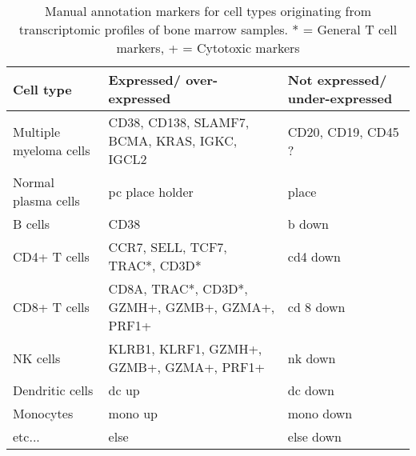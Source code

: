 \begin{table}[h]
    \centering
\begin{tabular}{|p{2cm}|p{6cm}|p{5cm}|}
\hline
\textbf{Cell type}     & \textbf{Expressed/ over-expressed}                                                                      & \textbf{Not expressed/ under-expressed} \\ \hline
Multiple myeloma cells & CD38, CD138, SLAMF7,  BCMA, KRAS, IGKC, IGCL2                                                             & CD20, CD19, CD45 ?                       \\ \hline
Normal plasma cells    & pc place holder                                                                                           & place                                    \\ \hline
B cells                & CD38                                                                                                      & b down                                   \\ \hline
CD4+ T cells           & CCR7, SELL, TCF7, TRAC*, CD3D*                                                                            & cd4 down                                 \\ \hline
CD8+ T cells           & CD8A, TRAC*,  CD3D*, GZMH+,  GZMB+,  GZMA+,  PRF1+                                                        & cd 8 down                                                         \\ \hline
NK cells               & KLRB1,  KLRF1, GZMH+,  GZMB+,  GZMA+,  PRF1+                                                              & nk down                                  \\ \hline
Dendritic cells        & dc up                                                                                                     & dc down                                  \\ \hline
Monocytes              & mono up                                                                                                   & mono down                                \\ \hline
etc...                 & else                                                                                                      & else down                                \\ \hline
\end{tabular}
\caption[Manual annotation markers]{Manual annotation markers for cell types originating from transcriptomic profiles of bone marrow samples.
* = General T cell markers, + = Cytotoxic markers}
\label{tab:annotation_markers}
\end{table}